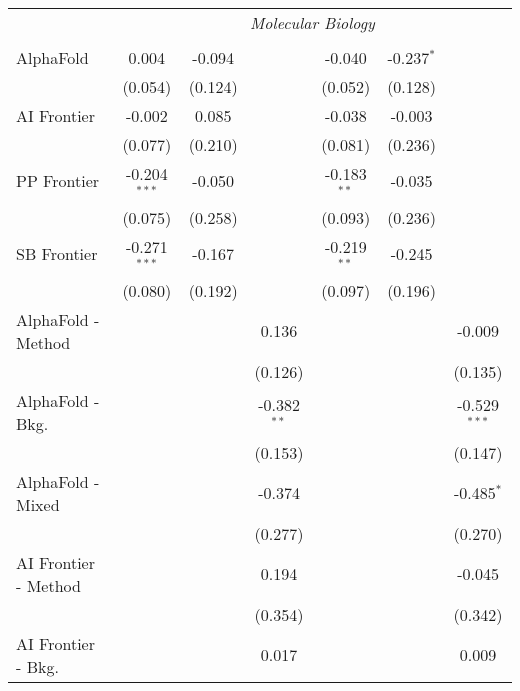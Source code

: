 \begin{tabular}{lcccccc}
 & \multicolumn{6}{c}{\textit{Molecular Biology}} \\ \\
   AlphaFold            & 0.004          & -0.094  &               & -0.040        & -0.237$^{*}$ &   \\   
                        & (0.054)        & (0.124) &               & (0.052)       & (0.128)      &   \\   
   AI Frontier          & -0.002         & 0.085   &               & -0.038        & -0.003       &   \\   
                        & (0.077)        & (0.210) &               & (0.081)       & (0.236)      &   \\   
   PP Frontier          & -0.204$^{***}$ & -0.050  &               & -0.183$^{**}$ & -0.035       &   \\   
                        & (0.075)        & (0.258) &               & (0.093)       & (0.236)      &   \\   
   SB Frontier          & -0.271$^{***}$ & -0.167  &               & -0.219$^{**}$ & -0.245       &   \\   
                        & (0.080)        & (0.192) &               & (0.097)       & (0.196)      &   \\   
   AlphaFold - Method   &                &         & 0.136         &               &              & -0.009\\   
                        &                &         & (0.126)       &               &              & (0.135)\\   
   AlphaFold - Bkg.     &                &         & -0.382$^{**}$ &               &              & -0.529$^{***}$\\   
                        &                &         & (0.153)       &               &              & (0.147)\\   
   AlphaFold - Mixed    &                &         & -0.374        &               &              & -0.485$^{*}$\\   
                        &                &         & (0.277)       &               &              & (0.270)\\   
   AI Frontier - Method &                &         & 0.194         &               &              & -0.045\\   
                        &                &         & (0.354)       &               &              & (0.342)\\   
   AI Frontier - Bkg.   &                &         & 0.017         &               &              & 0.009\\   

\end{tabular}
